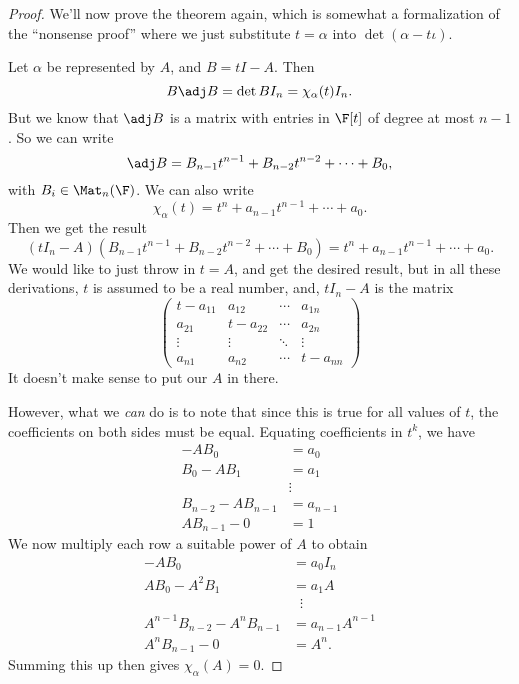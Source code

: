 \documentclass[a4paper]{article}
\begin{document}
\begin{proof}
  We'll now prove the theorem again, which is somewhat a formalization of the ``nonsense proof'' where we just substitute $t = \alpha$ into $\det (\alpha - t\iota)$.

  Let $\alpha$ be represented by $A$, and $B = tI - A$. Then
  \[
    B\adj B = \det B I_n = \chi_\alpha(t) I_n.
  \]
  But we know that $\adj B$ is a matrix with entries in $\F[t]$ of degree at most $n - 1$. So we can write
  \[
    \adj B = B_{n - 1}t^{n - 1} + B_{n - 2}t^{n - 2} + \cdots + B_0,
  \]
  with $B_i \in \Mat_n (\F)$. We can also write
  \[
    \chi_\alpha(t) = t^n + a_{n - 1}t^{n - 1} + \cdots + a_0.
  \]
  Then we get the result
  \[
    (tI_n - A) (B_{n - 1}t^{n - 1} + B_{n - 2} t^{n - 2} + \cdots + B_0) = t^n + a_{n - 1} t^{n - 1} + \cdots + a_0.
  \]
  We would like to just throw in $t = A$, and get the desired result, but in all these derivations, $t$ is assumed to be a real number, and, $tI_n - A$ is the matrix
  \[
    \begin{pmatrix}
      t - a_{11} & a_{12} & \cdots & a_{1n}\\
      a_{21} & t - a_{22} & \cdots & a_{2n}\\
      \vdots & \vdots & \ddots & \vdots\\
      a_{n1} & a_{n2} & \cdots & t - a_{nn}
    \end{pmatrix}
  \]
  It doesn't make sense to put our $A$ in there.

  However, what we \emph{can} do is to note that since this is true for all values of $t$, the coefficients on both sides must be equal. Equating coefficients in $t^k$, we have
  \begin{align*}
    -A B_0 &= a_0\\
    B_0 - AB_1 &= a_1\\
    &\vdots\\
    B_{n - 2} - AB_{n - 1} &= a_{n - 1}\\
    AB_{n - 1} - 0 &= 1
  \end{align*}
  We now multiply each row a suitable power of $A$ to obtain
  \begin{align*}
    -A B_0 &= a_0 I_n\\
    A B_0 - A^2B_1 &= a_1 A\\
    &\;\;\vdots\\
    A^{n - 1}B_{n - 2} - A^n B_{n - 1} &= a_{n - 1} A^{n - 1}\\
    A^{n}B_{n - 1} - 0 &= A^n.
  \end{align*}
  Summing this up then gives $\chi_\alpha(A) = 0$.
\end{proof}
\end{document}
